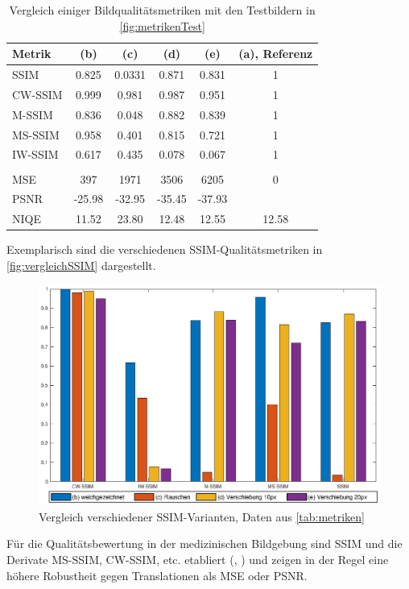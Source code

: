 \begin{table}[H]
	\centering
	\caption[Vergleich Bildqualitätsmetriken]{Vergleich einiger Bildqualitätsmetriken mit den Testbildern in \autoref{fig:metrikenTest}}
	\label{tab:metriken}
	\begin{tabular}{lSSSSS}
		\toprule
		\textbf{Metrik} & \textbf{(b)} & \textbf{(c)} & \textbf{(d)} & \textbf{(e)} & \textbf{(a), Referenz} \\
		\midrule
		SSIM    & 0.825 & 0.0331 & 0.871 & 0.831 & 1 \\
		CW-SSIM & 0.999 & 0.981  & 0.987 & 0.951 & 1 \\
		M-SSIM  & 0.836 & 0.048  & 0.882 & 0.839 & 1 \\
		MS-SSIM & 0.958 & 0.401  & 0.815 & 0.721 & 1 \\
		IW-SSIM & 0.617 & 0.435  & 0.078 & 0.067 & 1 \\
		& & & & & \\
		MSE     & 397     & 1971     & 3506    & 6205    & 0 \\
		PSNR    & -25.98  & -32.95   & -35.45  & -37.93  &  \\
		NIQE    & 11.52   & 23.80    & 12.48   & 12.55   & 12.58 \\
		\bottomrule
	\end{tabular}
\end{table}

Exemplarisch sind die verschiedenen SSIM-Qualitätsmetriken in \autoref{fig:vergleichSSIM} dargestellt.

\begin{figure}[H]
	\centering
	\includegraphics[width=\textwidth]{img/metrics/ssimComp2.eps}
	\caption[Vergleich verschiedener SSIM-Varianten]{Vergleich verschiedener SSIM-Varianten, Daten aus \autoref{tab:metriken}}
	\label{fig:vergleichSSIM}
\end{figure}

Für die Qualitätsbewertung in der medizinischen Bildgebung sind SSIM und die Derivate MS-SSIM, CW-SSIM, etc. etabliert (\cite{Punga2014}, \cite{VenkatNarayanaRao2013}) und zeigen in der Regel eine höhere Robustheit gegen Translationen als MSE oder PSNR.















